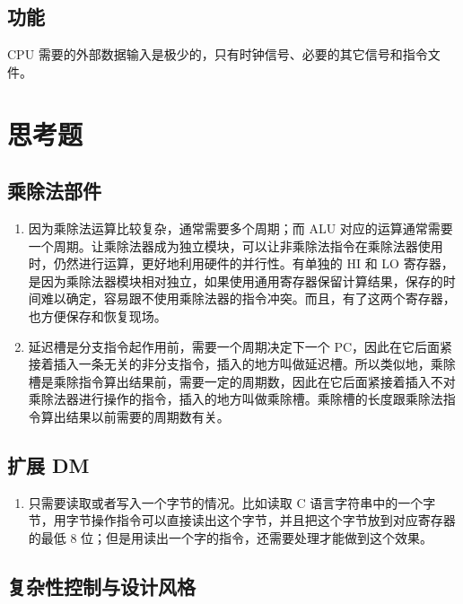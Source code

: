 \documentclass[12pt,AutoFakeBold,AutoFakeSlant]{article}
\begin{document}
\hypertarget{ux529fux80fd-14}{%
\subsection{功能}\label{ux529fux80fd-14}}

CPU 需要的外部数据输入是极少的，只有时钟信号、必要的其它信号和指令文件。

\section{思考题}

\subsection{乘除法部件}

\begin{enumerate}
\item 因为乘除法运算比较复杂，通常需要多个周期；而 ALU 对应的运算通常需要一个周期。让乘除法器成为独立模块，可以让非乘除法指令在乘除法器使用时，仍然进行运算，更好地利用硬件的并行性。有单独的 HI 和 LO 寄存器，是因为乘除法器模块相对独立，如果使用通用寄存器保留计算结果，保存的时间难以确定，容易跟不使用乘除法器的指令冲突。而且，有了这两个寄存器，也方便保存和恢复现场。
\item 延迟槽是分支指令起作用前，需要一个周期决定下一个 PC，因此在它后面紧接着插入一条无关的非分支指令，插入的地方叫做延迟槽。所以类似地，乘除槽是乘除指令算出结果前，需要一定的周期数，因此在它后面紧接着插入不对乘除法器进行操作的指令，插入的地方叫做乘除槽。乘除槽的长度跟乘除法指令算出结果以前需要的周期数有关。
\end{enumerate}

\subsection{扩展 DM}

\begin{enumerate}
\item 只需要读取或者写入一个字节的情况。比如读取 C 语言字符串中的一个字节，用字节操作指令可以直接读出这个字节，并且把这个字节放到对应寄存器的最低 8 位；但是用读出一个字的指令，还需要处理才能做到这个效果。
\end{enumerate}

\subsection{复杂性控制与设计风格}
\end{document}
